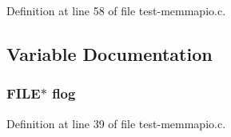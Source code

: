 Definition at line 58 of file test-\/memmapio.\-c.



\subsection{Variable Documentation}
\hypertarget{test-memmapio_8c_a124fb35b6a498a5b2a566cbc525af8d7}{
\subsubsection[{flog}]{\setlength{\rightskip}{0pt plus 5cm}F\-I\-L\-E$\ast$ flog}}\label{test-memmapio_8c_a124fb35b6a498a5b2a566cbc525af8d7}


Definition at line 39 of file test-\/memmapio.\-c.

